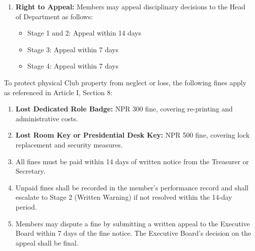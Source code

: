\begin{enumerate}[label=\alph*), leftmargin=2em, itemsep=0.3em]
    \item \textbf{Right to Appeal:} Members may appeal disciplinary decisions to the Head of Department as follows:
    \begin{itemize}[leftmargin=1.5em, itemsep=0.2em]
        \item Stage 1 and 2: Appeal within 14 days
        \item Stage 3: Appeal within 7 days
        \item Stage 4: Appeal within 7 days
    \end{itemize}
\end{enumerate}


To protect physical Club property from neglect or loss, the following fines apply as referenced in Article I, Section 8:

\begin{enumerate}[label=\alph*), leftmargin=2em, itemsep=0.3em]
    \item \textbf{Lost Dedicated Role Badge:} NPR 300 fine, covering re-printing and administrative costs.
    
    \item \textbf{Lost Room Key or Presidential Desk Key:} NPR 500 fine, covering lock replacement and security measures.
    
    \item All fines must be paid within 14 days of written notice from the Treasurer or Secretary.
    
    \item Unpaid fines shall be recorded in the member's performance record and shall escalate to Stage 2 (Written Warning) if not resolved within the 14-day period.
    
    \item Members may dispute a fine by submitting a written appeal to the Executive Board within 7 days of the fine notice. The Executive Board's decision on the appeal shall be final.
\end{enumerate}
